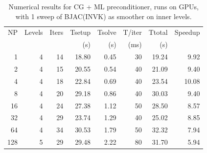 \begin{table}[h!]
\centering
\caption{Numerical results for CG + ML preconditioner, runs on GPUs, with 1 sweep of BJAC(INVK) as smoother on inner levels.}
\label{gpu-invk}

\begin{tabular}{rrrrrrrr}
NP  & Levels & Iters & Tsetup & Tsolve & T/iter & Ttotal & Speedup\\
    &        &       & (s)    & (s)    & (ms)   & (s)   &  \\
\hline
1   & 4       & 14  & 18.80 & 0.45 & 30   & 19.24& 9.92  \\
2   & 4       & 15  & 20.55 & 0.54 & 40   & 21.09& 9.40  \\
4   & 4       & 18  & 22.84 & 0.69 & 40   & 23.54& 10.08 \\
8   & 4       & 20  & 29.18 & 0.86 & 40   & 30.03& 9.40  \\
16  & 4       & 24  & 27.38 & 1.12 & 50   & 28.50& 8.57  \\
32  & 4       & 29  & 23.74 & 1.29 & 40   & 25.02& 8.85  \\
64  & 4       & 34  & 30.53 & 1.79 & 50   & 32.32& 7.94  \\
128 & 5       & 29  & 29.48 & 2.22 & 80   & 31.70& 5.94  \\
\hline
\end{tabular}
\end{table}


